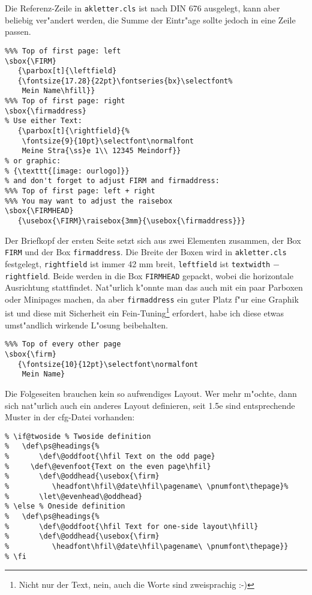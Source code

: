 \documentclass[a4paper]{article}
\begin{document}
Die Referenz-Zeile in \texttt{akletter.cls} ist nach DIN 
676 ausgelegt, kann aber beliebig ver"andert werden, die Summe 
der Eintr"age sollte jedoch in eine Zeile passen.

\begin{verbatim}
%%% Top of first page: left
\sbox{\FIRM}
   {\parbox[t]{\leftfield}
   {\fontsize{17.28}{22pt}\fontseries{bx}\selectfont%
    Mein Name\hfill}}
%%% Top of first page: right
\sbox{\firmaddress}
% Use either Text:
   {\parbox[t]{\rightfield}{%
    \fontsize{9}{10pt}\selectfont\normalfont
    Meine Stra{\ss}e 1\\ 12345 Meindorf}}
% or graphic:
% {\texttt{[image: ourlogo]}}
% and don't forget to adjust FIRM and firmaddress:
%%% Top of first page: left + right
%%% You may want to adjust the raisebox
\sbox{\FIRMHEAD}
   {\usebox{\FIRM}\raisebox{3mm}{\usebox{\firmaddress}}}
\end{verbatim}

Der Briefkopf der ersten Seite setzt sich aus zwei Elementen 
zusammen, der Box \texttt{FIRM} und der Box 
\texttt{firmaddress}. Die Breite der Boxen wird in 
\texttt{akletter.cls} festgelegt, \texttt{rightfield} ist immer 42 mm 
breit, \texttt{leftfield} ist \texttt{textwidth} $-$ 
\texttt{rightfield}. Beide werden in die Box \texttt{FIRMHEAD} 
gepackt, wobei die horizontale Ausrichtung stattfindet. 
Nat"urlich k"onnte man das auch mit ein paar Parboxen oder 
Minipages machen, da aber \texttt{firmaddress} ein guter Platz 
f"ur eine Graphik ist und diese mit Sicherheit ein 
Fein-Tuning\footnote{Nicht nur der Text, nein, auch die Worte 
sind zweisprachig :-)} erfordert, habe ich diese etwas 
umst"andlich wirkende L"osung beibehalten.

\begin{verbatim}
%%% Top of every other page
\sbox{\firm}
   {\fontsize{10}{12pt}\selectfont\normalfont
    Mein Name}
\end{verbatim}

Die Folgeseiten brauchen kein so aufwendiges Layout. Wer mehr m"ochte, 
dann sich nat"urlich auch ein anderes Layout definieren, seit 1.5e 
sind entsprechende Muster in der cfg-Datei vorhanden:

\begin{verbatim}
% \if@twoside % Twoside definition
%   \def\ps@headings{%
%       \def\@oddfoot{\hfil Text on the odd page}
% 	  \def\@evenfoot{Text on the even page\hfil}
%       \def\@oddhead{\usebox{\firm}
%          \headfont\hfil\@date\hfil\pagename\ \pnumfont\thepage}%
%       \let\@evenhead\@oddhead}
% \else % Oneside definition
%   \def\ps@headings{%
%       \def\@oddfoot{\hfil Text for one-side layout\hfill}
%       \def\@oddhead{\usebox{\firm}
%          \headfont\hfil\@date\hfil\pagename\ \pnumfont\thepage}}
% \fi
\end{verbatim}
\end{document}
